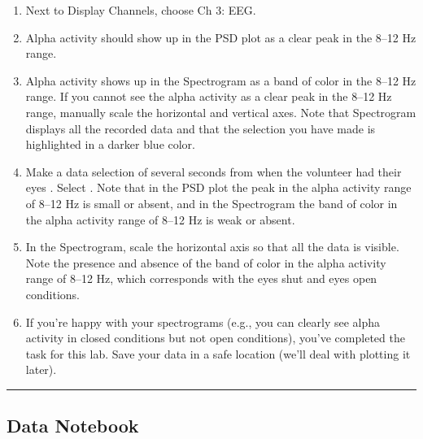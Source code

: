\documentclass[letterpaper,10pt,english]{jupyterBook}
\begin{document}
\sphinxAtStartPar
{}
\begin{enumerate}
%
\setcounter{enumi}{2}
\item {} 
\sphinxAtStartPar
Next to Display Channels, choose Ch 3: EEG.

\item {} 
\sphinxAtStartPar
Alpha activity should show up in the PSD plot as a clear peak in the 8–12 Hz range.

\item {} 
\sphinxAtStartPar
Alpha activity shows up in the Spectrogram as a band of color in the 8–12 Hz range. If you cannot see the alpha activity as a clear peak in the 8–12 Hz range, manually scale the horizontal and vertical axes. Note that Spectrogram displays all the recorded data and that the selection you have made is highlighted in a darker blue color.

\item {} 
\sphinxAtStartPar
Make a data selection of several seconds from when the volunteer had their eyes . Select . Note that in the PSD plot the peak in the alpha activity range of 8–12 Hz is small or absent, and in the Spectrogram the band of color in the alpha activity range of 8–12 Hz is weak or absent.

\item {} 
\sphinxAtStartPar
In the Spectrogram, scale the horizontal axis so that all the data is visible. Note the presence and absence of the band of color in the alpha activity range of 8–12 Hz, which corresponds with the eyes shut and eyes open conditions.

\item {} 
\sphinxAtStartPar
If you’re happy with your spectrograms (e.g., you can clearly see alpha activity in closed conditions but not open conditions), you’ve completed the task for this lab. Save your data in a safe location (we’ll deal with plotting it later).

\end{enumerate}


\bigskip\hrule\bigskip



\subsection{Data Notebook}
\label{\detokenize{EEG:data-notebook}}
\end{document}

